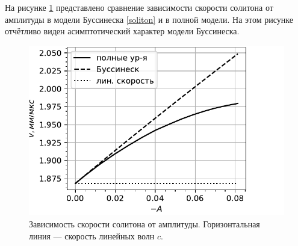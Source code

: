 \documentclass[12pt, a4paper]{article}
\begin{document}
На рисунке \ref{fig:sol_compare} представлено сравнение зависимости скорости солитона от амплитуды в модели Буссинеска \eqref{soliton} и в полной модели. На этом рисунке отчётливо виден асимптотический характер модели Буссинеска.
\begin{figure}[h!]
	\centering
	\includegraphics[width=0.53\linewidth]{Figures/VelAmplSmall}
	\vspace{-2mm}
	\caption{Зависимость скорости солитона от амплитуды. Горизонтальная линия --- скорость линейных волн $c$.}
	\label{fig:sol_compare}
	\vspace{-3mm}
\end{figure}


\end{document}
